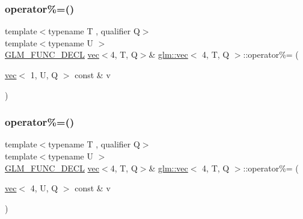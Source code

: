 \mbox{\label{structglm_1_1vec_3_014_00_01_t_00_01_q_01_4_af2437a9e70535d7ae0c01c7be439c209}} 
\subsubsection{\texorpdfstring{operator\%=()}{operator\%=()}\hspace{0.1cm}{\footnotesize\ttfamily [2/6]}}
{\footnotesize\ttfamily template$<$typename T , qualifier Q$>$ \\
template$<$typename U $>$ \\
\mbox{\hyperlink{setup_8hpp_ab2d052de21a70539923e9bcbf6e83a51}{G\+L\+M\+\_\+\+F\+U\+N\+C\+\_\+\+D\+E\+CL}} \mbox{\hyperlink{structglm_1_1vec}{vec}}$<$4, T, Q$>$\& \mbox{\hyperlink{structglm_1_1vec}{glm\+::vec}}$<$ 4, T, Q $>$\+::operator\%= (\begin{DoxyParamCaption}\item[{\mbox{\hyperlink{structglm_1_1vec}{vec}}$<$ 1, U, Q $>$ const \&}]{v }\end{DoxyParamCaption})}

\mbox{\label{structglm_1_1vec_3_014_00_01_t_00_01_q_01_4_a10da98a89881a5135b526ceaa75c6f13}} 
\subsubsection{\texorpdfstring{operator\%=()}{operator\%=()}\hspace{0.1cm}{\footnotesize\ttfamily [3/6]}}
{\footnotesize\ttfamily template$<$typename T , qualifier Q$>$ \\
template$<$typename U $>$ \\
\mbox{\hyperlink{setup_8hpp_ab2d052de21a70539923e9bcbf6e83a51}{G\+L\+M\+\_\+\+F\+U\+N\+C\+\_\+\+D\+E\+CL}} \mbox{\hyperlink{structglm_1_1vec}{vec}}$<$4, T, Q$>$\& \mbox{\hyperlink{structglm_1_1vec}{glm\+::vec}}$<$ 4, T, Q $>$\+::operator\%= (\begin{DoxyParamCaption}\item[{\mbox{\hyperlink{structglm_1_1vec}{vec}}$<$ 4, U, Q $>$ const \&}]{v }\end{DoxyParamCaption})}

